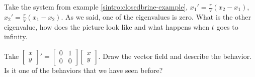 \documentclass{ximera}
\begin{document}
\begin{exercise}
    Take the system from example \ref{sintro:closedbrine-example}, $x_1'=\frac{r}{V}(x_2-x_1)$, $x_2'=\frac{r}{V}(x_1-x_2)$. As we said, one of the eigenvalues is zero.  What is the other eigenvalue, how does the picture look like and what happens when $t$ goes to infinity.
\end{exercise}

\begin{exercise}%
    Take 
    $\left[ 
    \begin{smallmatrix}
        x \\ 
        y 
    \end{smallmatrix}
    \right] '
    = \left[ 
    \begin{smallmatrix} 
        0 & 1 \\ 
        0 & 0
    \end{smallmatrix}
    \right] \left[ 
    \begin{smallmatrix}
        x \\ 
        y 
    \end{smallmatrix}\right]$.
    Draw the vector field and describe the behavior.  Is it one of the behaviors that we have seen before?
\end{exercise}
\end{document}
